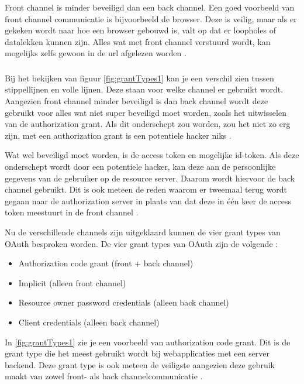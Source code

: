 \subsubsection{}
Front channel is minder beveiligd dan een back channel. Een goed voorbeeld van front channel communicatie is bijvoorbeeld de browser. Deze is veilig, maar als er gekeken wordt naar hoe een browser gebouwd is, valt op dat er loopholes of datalekken kunnen zijn. Alles wat met front channel verstuurd wordt, kan mogelijks zelfs gewoon in de url afgelezen worden \autocite{OktaDev2018}.
\subsubsection{}
Bij het bekijken van figuur \ref{fig:grantTypes1} kan je een verschil zien tussen stippellijnen en volle lijnen. Deze staan voor welke channel er gebruikt wordt. Aangezien front channel minder beveiligd is dan back channel wordt deze gebruikt voor alles wat niet super beveiligd moet worden, zoals het uitwisselen van de authorization grant. Als dit onderschept zou worden, zou het niet zo erg zijn, met een authorization grant is een potentiele hacker niks \autocite{OktaDev2018}. 

Wat wel beveiligd moet worden, is de access token en mogelijke id-token. Als deze onderschept wordt door een potentiele hacker, kan deze aan de persoonlijke gegevens van de gebruiker op de resource server. Daarom wordt hiervoor de back channel gebruikt. Dit is ook meteen de reden waarom er tweemaal terug wordt gegaan naar de authorization server in plaats van dat deze in één keer de access token meestuurt in de front channel \autocite{OktaDev2018}.

Nu de verschillende channels zijn uitgeklaard kunnen de vier grant types van OAuth besproken worden. De vier grant types van OAuth zijn de volgende \autocite{OktaDev2018}:
\begin{itemize}
	\item Authorization code grant (front + back channel)
	\item Implicit (alleen front channel)
	\item Resource owner password credentials (alleen back channel)
	\item Client credentials (alleen back channel)
\end{itemize}
In \ref{fig:grantTypes1} zie je een voorbeeld van authorization code grant. Dit is de grant type die het meest gebruikt wordt bij webapplicaties met een server backend. Deze grant type is ook meteen de veiligste aangezien deze gebruik maakt van zowel front- als back channelcommunicatie \autocite{OktaDev2018}.

